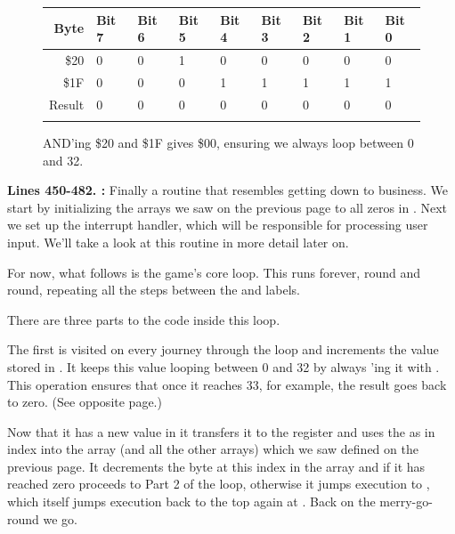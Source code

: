 \begin{figure}[H]
  {
    \setlength{\tabcolsep}{3.0pt}
    \setlength\cmidrulewidth{\heavyrulewidth} %
    \begin{adjustbox}{width=7cm,center}

      \begin{tabular}{rllllllll}
        \toprule
        Byte & Bit 7 & Bit 6 & Bit 5 & Bit 4 & Bit 3 & Bit 2 & Bit 1 & Bit 0        \\
        \midrule
        \$20 & 0 & 0 & 1 & 0 & 0 & 0 & 0 & 0 \\
        \$1F & 0 & 0 & 0 & 1 & 1 & 1 & 1 & 1 \\
        \midrule
        Result & 0 & 0 & 0 & 0 & 0 & 0 & 0 & 0 \\
        \addlinespace
        \bottomrule
      \end{tabular}
    \end{adjustbox}
    }\caption*{AND'ing \$20 and \$1F gives \$00, ensuring we always loop between 0 and 32.}
\end{figure}
\clearpage
{}
\textbf{Lines 450-482. :} Finally a routine that resembles getting down to business. We start by initializing the arrays we saw on the 
previous page to all zeros in . Next we set up the interrupt handler, which will
be responsible for processing user input. We'll take a look at this routine in more detail later on.

For now, what follows is the game's core loop. This runs forever, round and round, repeating all the steps between the
 and  labels. 

There are three parts to the code inside this loop. 

The first is visited on every journey through the loop and increments the
value stored in . It keeps this value looping between 0 and 32 by always 'ing
it with . This  operation ensures that once it reaches 33, for example, the result
goes back to zero. (See opposite page.)

Now that it has a new value in  it transfers it to the  register and uses the 
 as in index into the  array (and all the other arrays) which we saw defined on the previous 
page. It decrements the byte at this index in the  array and if it has reached zero
proceeds to Part 2 of the loop, otherwise it jumps execution to , which itself jumps execution
back to the top again at . Back on the merry-go-round we go.

